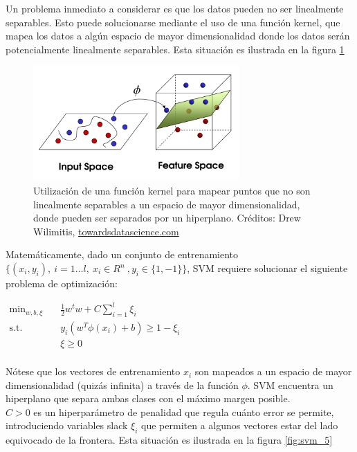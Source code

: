 Un problema inmediato a considerar es que los datos pueden no ser linealmente separables. Esto puede solucionarse mediante el uso de una función kernel, que mapea los datos a algún espacio de mayor dimensionalidad donde los datos serán potencialmente linealmente separables. Esta situación es ilustrada en la figura \ref{fig:svm_4}\\

\begin{figure}[h!]
\begin{center}
  \includegraphics[width=0.7\textwidth]{Kap1/svm5.png} 
  \end{center}
 \caption{ Utilización de una función kernel para mapear puntos que no son linealmente separables a un espacio de mayor dimensionalidad, donde pueden ser separados por un hiperplano. Créditos: Drew Wilimitis, \url{towardsdatascience.com} }
\label{fig:svm_4}
\end{figure}

Matemáticamente, dado un conjunto de entrenamiento $\{ (x_i,y_i), \ i=1 \ldots l, \ x_i \in R^n \ , y_i \in \{1,-1\} \}$, SVM requiere solucionar el siguiente problema de optimización:

\begin{center}
$\begin{aligned}
\min_{w,b,\xi} \quad & \frac{1}{2}w^{t}w+C\sum_{i=1}^{l}{\xi_{i}}\\
\textrm{s.t.} \quad & y_{i}(w^T\phi(x_{i})+b) \geq 1 - \xi_{i}\\
  &\xi\geq0    \\
\end{aligned}
$
\end{center}

Nótese que los vectores de entrenamiento $x_i$ son mapeados a un espacio de mayor dimensionalidad (quizás infinita) a través de la función $\phi$. SVM encuentra un hiperplano que separa ambas clases con el máximo margen posible. \\

$C>0$ es un hiperparámetro de penalidad que regula cuánto error se permite, introduciendo  variables slack $\xi_i$ que permiten a algunos vectores estar del lado equivocado de la frontera. Esta situación es ilustrada en la figura \ref{fig:svm_5}\\


